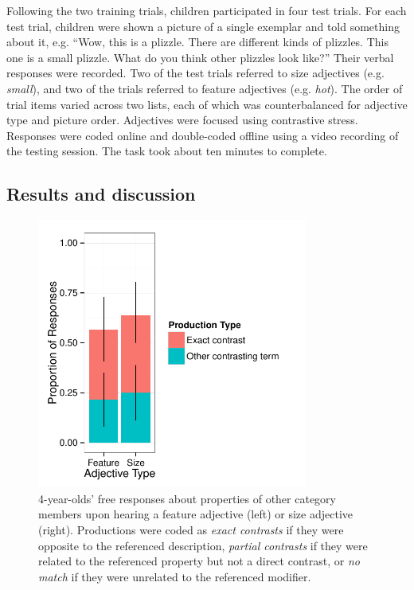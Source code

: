 \documentclass[man]{apa2}
\begin{document}
Following the two training trials, children participated in four test trials.  For each test trial, children were shown a picture of a single exemplar and told something about it, e.g. ``Wow, this is a plizzle. There are different kinds of plizzles. This one is a small plizzle.  What do you think other plizzles look like?'' Their verbal responses were recorded.  Two of the test trials referred to size adjectives (e.g. \emph{small}), and two of the trials referred to feature adjectives (e.g. \emph{hot}).  The order of trial items varied across two lists, each of which was counterbalanced for adjective type and picture order.  Adjectives were focused using contrastive stress. Responses were coded online and double-coded offline using a video recording of the testing session.  The task took about ten minutes to complete. 

\subsection{Results and discussion}

\begin{figure}[t] 
  \begin{center} 
    \includegraphics[width=3.5in]{figures/expt3.pdf} 
    \caption{\label{fig:freeResponse} 4-year-olds' free responses about properties of other category members upon hearing a feature adjective (left) or size adjective (right).  Productions were coded as \emph{exact contrasts} if they were opposite to the referenced description, \emph{partial contrasts} if they were related to the referenced property but not a direct contrast, or \emph{no match} if they were unrelated to the referenced modifier. }
  \end{center} 
\end{figure}
\end{document}
